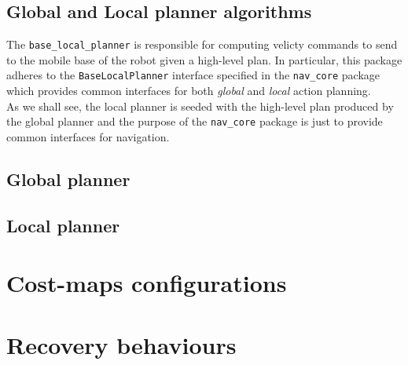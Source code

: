 \subsection{Global and Local planner algorithms}
The \texttt{base\_local\_planner} is responsible for computing velicty commands
to send to the mobile base of the robot given a high-level plan. In particular,
this package adheres to the \texttt{BaseLocalPlanner} interface specified in the 
\texttt{nav\_core} package which provides common interfaces for both \textit{global}
and \textit{local} action planning.
\\
As we shall see, the local planner is seeded with the high-level plan produced by
the global planner and the purpose of the \texttt{nav\_core} package is just to 
provide common interfaces for navigation. 
\subsection*{Global planner}
\subsection*{Local planner}
\section{Cost-maps configurations}
\section{Recovery behaviours}

